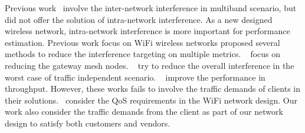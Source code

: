 Previous work~\cite{pcuiwinmee} involve the inter-network interference in
multiband scenario, but did not offer the solution of intra-network interference.
As a new designed wireless network, intra-network interference is 
more important for performance estimation. Previous work focus on
WiFi wireless networks proposed several methods to reduce the 
interference targeting on multiple metrics.
~\cite{tang2005interference,he2008optimizing,robinson2010deploying}
focus on reducing the gateway mesh nodes. ~\cite{irwin2013resource,subramanian2008minimum} try to reduce the
overall interference in the worst case of traffic independent scenario.
~\cite{chieochan2013channel,li2012channel} improve the performance
in throughput. However, these works fails to involve the traffic demands
of clients in their solutions.~\cite{robinson2010deploying,long2013fair} consider
the QoS requirements in the WiFi network design. Our work also
consider the traffic demands from the client as part of our 
network design to satisfy both customers and vendors.




